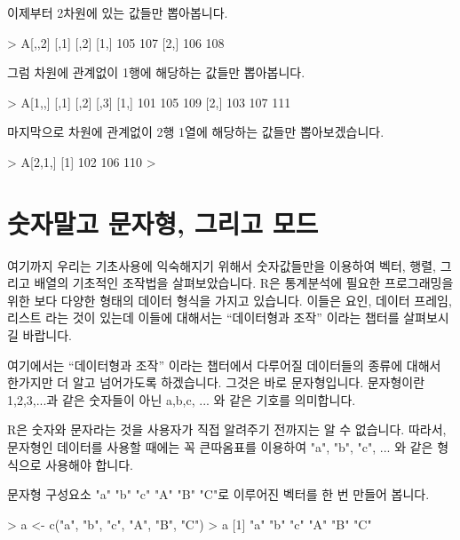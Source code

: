 \documentclass{book}
\begin{document}
이제부터 2차원에 있는 값들만 뽑아봅니다. 

\begin{Schunk}
\begin{Soutput}
> A[,,2]
     [,1] [,2]
[1,]  105  107
[2,]  106  108
\end{Soutput}
\end{Schunk}


그럼 차원에 관계없이 1행에 해당하는 값들만 뽑아봅니다.
\begin{Schunk}
\begin{Soutput}
> A[1,,]
     [,1] [,2] [,3]
[1,]  101  105  109
[2,]  103  107  111
\end{Soutput}
\end{Schunk}


마지막으로 차원에 관계없이 2행 1열에 해당하는 값들만 뽑아보겠습니다. 

\begin{Schunk}
\begin{Soutput}
> A[2,1,]
[1] 102 106 110
> 
\end{Soutput}
\end{Schunk}


\section{숫자말고 문자형, 그리고 모드}

여기까지 우리는 기초사용에 익숙해지기 위해서 숫자값들만을 이용하여 벡터, 행렬, 그리고 배열의 기초적인 조작법을 살펴보았습니다. 
R은 통계분석에 필요한 프로그래밍을 위한 보다 다양한 형태의 데이터 형식을 가지고 있습니다.
이들은 요인, 데이터 프레임, 리스트 라는 것이 있는데 이들에 대해서는 ``데이터형과 조작'' 이라는 챕터를 살펴보시길 바랍니다. 

여기에서는 ``데이터형과 조작'' 이라는 챕터에서 다루어질 데이터들의 종류에 대해서 한가지만 더 알고 넘어가도록 하겠습니다.
그것은 바로 문자형입니다. 
문자형이란 1,2,3,...과 같은 숫자들이 아닌 a,b,c, ... 와 같은 기호를 의미합니다.

R은 숫자와 문자라는 것을 사용자가 직접 알려주기 전까지는 알 수 없습니다. 
따라서, 문자형인 데이터를 사용할 때에는 꼭 큰따옴표를 이용하여 "a", "b", "c", ... 와 같은 형식으로 사용해야 합니다. 

문자형 구성요소 "a" "b" "c" "A" "B" "C"로 이루어진 벡터를 한 번 만들어 봅니다.

\begin{Schunk}
\begin{Soutput}
> a <- c("a", "b", "c", "A", "B", "C")
> a
[1] "a" "b" "c" "A" "B" "C"
\end{Soutput}
\end{Schunk}
\end{document}
